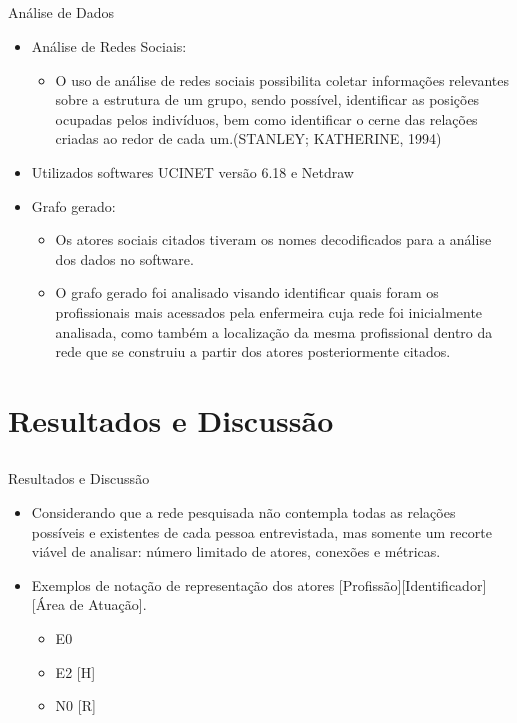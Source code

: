 \documentclass[10pt]{beamer}
\begin{document}
\subsection{}
\begin{frame}{Análise de Dados}{}
  \begin{itemize}
	\item Análise de Redes Sociais:
    \begin{itemize}
    	\item O uso de análise de redes sociais possibilita coletar informações relevantes
 sobre a estrutura de um grupo, sendo possível, identificar as posições ocupadas pelos indivíduos, bem como identificar o cerne das relações criadas ao redor de cada um.(STANLEY;
 KATHERINE, 1994)
    \end{itemize}
    \item Utilizados softwares UCINET versão 6.18 e Netdraw
    \item Grafo gerado:
    \begin{itemize}
    	\item Os atores sociais citados tiveram os nomes decodificados para a análise dos dados no software.
        \item O grafo gerado foi analisado visando identificar quais foram os profissionais mais acessados pela enfermeira cuja rede foi inicialmente analisada, como também a localização da mesma profissional dentro da rede que se construiu a partir dos atores posteriormente citados.
    \end{itemize}
  \end{itemize}
\end{frame}

\section{Resultados e Discussão}
\subsection{}
\begin{frame}{Resultados e Discussão}{}
  \begin{itemize}
	\item Considerando que a rede pesquisada não contempla todas as relações possíveis e existentes de cada pessoa entrevistada, mas somente um recorte viável de analisar: número limitado de atores, conexões e métricas.
    \item Exemplos de notação de representação dos atores [Profissão][Identificador] [Área de Atuação].
    \begin{itemize}
    	\item E0
        \item E2 [H]
        \item N0 [R]
    \end{itemize}
  \end{itemize}
\end{frame}
\end{document}
